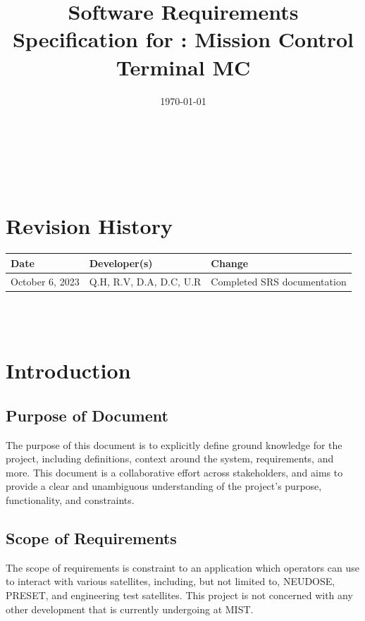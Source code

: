 \documentclass[12pt]{article}
\begin{document}
\title{Software Requirements Specification for \progname: Mission Control Terminal MC} 
\author{\authname}
\date{\today}
	
\maketitle

~\newpage


\tableofcontents

~\newpage

\section*{Revision History}
\begin{table}[hp]
\label{TblRevisionHistory}
\begin{tabularx}{\textwidth}{llX}
\toprule
\textbf{Date} & \textbf{Developer(s)} & \textbf{Change}\\
\midrule
October 6, 2023 & Q.H, R.V, D.A, D.C, U.R & Completed SRS documentation\\
\bottomrule
\end{tabularx}
\end{table}


~\\

~\newpage

\section{Introduction}
\subsection{Purpose of Document}
The purpose of this document is to explicitly define ground knowledge for the project, including definitions, context around the system, requirements, and more. This document is a collaborative effort across stakeholders, and aims to provide a clear and unambiguous understanding of the project’s purpose, functionality, and constraints.

\subsection{Scope of Requirements}
The scope of requirements is constraint to an application which operators can use to interact with various satellites, including, but not limited to, NEUDOSE, PRESET, and engineering test satellites. This project is not concerned with any other development that is currently undergoing at MIST.
\end{document}
